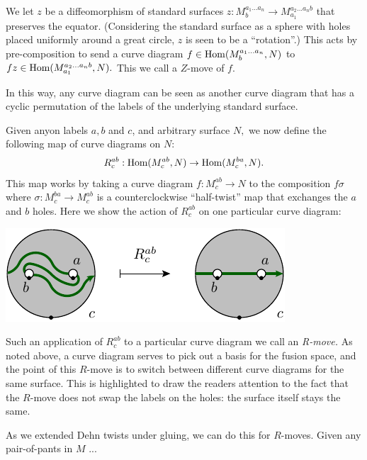 \documentclass[aps, prl, letterpaper, twocolumn, superscriptaddress, notitlepage, 10pt]{revtex4-1}
\begin{document}
We let $z$ be a diffeomorphism of standard surfaces 
$z : M^{a_1...a_n}_{b} \to  M^{a_2...a_n{b}}_{{a_1}}$
that preserves the equator.
(Considering the standard surface as a sphere with holes
placed uniformly around a great circle, $z$ is seen to
be a ``rotation''.)
This acts by pre-composition to
send a curve diagram $f\in {\mathrm{Hom}}(M^{a_1...a_n}_{b}, N)$ to 
$fz \in {\mathrm{Hom}}(M^{a_2...a_n{b}}_{{a_1}}, N).$
This we call a $Z$-move of $f.$

In this way, any curve diagram can be seen as another
curve diagram that has a cyclic permutation of the labels of
the underlying standard surface.

Given anyon labels $a, b$ and $c$, and arbitrary
surface $N,$
we now define the following map of curve diagrams on $N:$
$$R^{ab}_c: {\mathrm{Hom}}(M^{ab}_c, N)\to {\mathrm{Hom}}(M^{ba}_c, N).$$
This map works by taking a curve diagram 
$f:M^{ab}_c\to N$ to the composition $f\sigma$ where
$\sigma:M^{ba}_c\to M^{ab}_c$
is a counterclockwise ``half-twist'' map that exchanges
the $a$ and $b$ holes.
Here we show the action of $R^{ab}_c$ on one particular curve diagram:
\begin{center}
\includegraphics[]{pic-rmove-1.pdf}
\end{center}
Such an application of $R^{ab}_c$ to a particular
curve diagram we call an \emph{R-move.}
As noted above, a curve diagram serves to pick out
a basis for the fusion space, and the point of this $R$-move is
to switch between different curve diagrams for the same surface.
This is highlighted to draw the readers attention to
the fact that the $R$-move does not swap the labels on the holes:
the surface itself stays the same.

As we extended Dehn twists under gluing,
we can do this for $R$-moves.
Given any pair-of-pants in $M$ ... 
\end{document}

